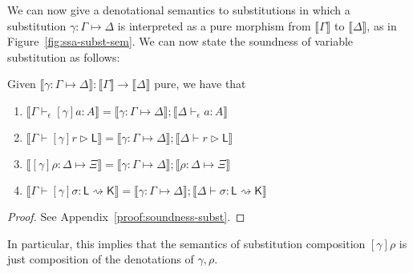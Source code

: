 \documentclass[acmsmall,screen,review]{acmart}
\newcommand{\ms}[1]{\ensuremath{\mathsf{#1}}}
\newcommand{\rupg}[1]{{#1}^\upharpoonright}
\newcommand{\lupg}[1]{{#1}^\upharpoonleft}
\newcommand{\hasty}[4]{#1 \vdash_{#2} #3: {#4}}
\newcommand{\haslb}[3]{#1 \vdash #2 \rhd #3}
\newcommand{\issubst}[3]{#1: #2 \mapsto #3}
\newcommand{\lbsubst}[4]{#1 \vdash #2: #3 \rightsquigarrow #4}
\newcommand{\dnt}[1]{\llbracket{#1}\rrbracket}
\begin{document}
We can now give a denotational semantics to substitutions in which a substitution
$\issubst{\gamma}{\Gamma}{\Delta}$ is interpreted as a pure morphism from $\dnt{\Gamma}$ to
$\dnt{\Delta}$, as in Figure~\ref{fig:ssa-subst-sem}. 
We can now state the soundness of variable substitution as follows:
\begin{theorem}[name=Soundness (Substitution), restate=soundnesssubst]
  Given $\dnt{\issubst{\gamma}{\Gamma}{\Delta}} : \dnt{\Gamma} \to \dnt{\Delta}$ pure, we have that
  \begin{enumerate}[label=(\alph*)]
    \item $\dnt{\hasty{\Gamma}{\epsilon}{[\gamma]a}{A}} 
      = \dnt{\issubst{\gamma}{\Gamma}{\Delta}};\dnt{\hasty{\Delta}{\epsilon}{a}{A}}$
      \label{itm:tm-subst-sound}
    \item $\dnt{\haslb{\Gamma}{[\gamma]r}{\ms{L}}}
      = \dnt{\issubst{\gamma}{\Gamma}{\Delta}};\dnt{\haslb{\Delta}{r}{\ms{L}}}$
    \item $\dnt{\issubst{[\gamma]\rho}{\Delta}{\Xi}}
      = \dnt{\issubst{\gamma}{\Gamma}{\Delta}};\dnt{\issubst{\rho}{\Delta}{\Xi}}$
    \item $\dnt{\lbsubst{\Gamma}{[\gamma]\sigma}{\ms{L}}{\ms{K}}}
      = \dnt{\issubst{\gamma}{\Gamma}{\Delta}};\dnt{\lbsubst{\Delta}{\sigma}{\ms{L}}{\ms{K}}}$
  \end{enumerate}
  \label{thm:subst-sound}
\end{theorem}
\begin{proof}
  See Appendix~\ref{proof:soundness-subst}.
\end{proof}
In particular, this implies that the semantics of substitution composition $[\gamma]\rho$ is just
composition of the denotations of $\gamma, \rho$.
\end{document}
